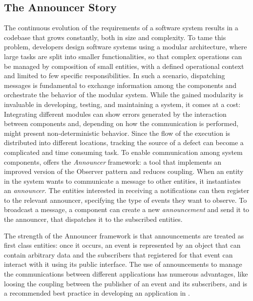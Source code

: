 \subsection{The Announcer Story}\label{sec:reified-story-announcer}

The continuous evolution of the requirements of a software system results in a codebase that grows constantly, both in size and complexity.
To tame this problem, developers design software systems using a modular architecture, where large tasks are split into smaller functionalities, so that complex operations can be managed by composition of small entities, with a defined operational context and limited to few specific responsibilities.
In such a scenario, dispatching messages is fundamental to exchange information among the components and orchestrate the behavior of the modular system.
While the gained modularity is invaluable in developing, testing, and maintaining a system, it comes at a cost: Integrating different modules can show errors generated by the interaction between components and, depending on how the communication is performed, might present non-deterministic behavior.
Since the flow of the execution is distributed into different locations, tracking the source of a defect can become a complicated and time consuming task.
To enable communication among system components, \pha offers the \emph{Announcer} framework: a tool that implements an improved version of the Observer pattern and reduces coupling.
When an entity in the system wants to communicate a message to other entities, it instantiates an \emph{announcer}.
The entities interested in receiving a notifications can then register to the relevant announcer, specifying the type of events they want to observe.
To broadcast a message, a component can create a new \emph{announcement} and send it to the announcer, that dispatches it to the subscribed entities.

The strength of the Announcer framework is that announcements are treated as first class entities: once it occurs, an event is represented by an object that can contain arbitrary data and the subscribers that registered for that event can interact with it using its public interface.
The use of announcements to manage the communications between different applications has numerous advantages, like loosing the coupling between the publisher of an event and its subscribers, and is a recommended best practice in developing an application in \pha.

